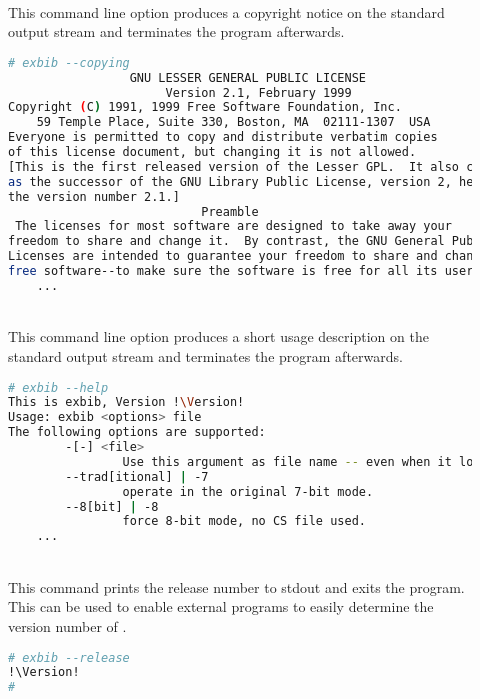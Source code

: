 \begin{description}
\item[]\ \\
  This command line option produces a copyright notice on the standard
  output stream and terminates the program afterwards.
  \begin{lstlisting}[language=sh]
# exbib --copying
                 GNU LESSER GENERAL PUBLIC LICENSE
                      Version 2.1, February 1999
Copyright (C) 1991, 1999 Free Software Foundation, Inc.
    59 Temple Place, Suite 330, Boston, MA  02111-1307  USA
Everyone is permitted to copy and distribute verbatim copies
of this license document, but changing it is not allowed.
[This is the first released version of the Lesser GPL.  It also counts
as the successor of the GNU Library Public License, version 2, hence
the version number 2.1.]
                           Preamble
 The licenses for most software are designed to take away your
freedom to share and change it.  By contrast, the GNU General Public
Licenses are intended to guarantee your freedom to share and change
free software--to make sure the software is free for all its users.
    ...
  \end{lstlisting}

\item[]
\item[]
\item[]\ \\
  This command line option produces a short usage description on the
  standard output stream and terminates the program afterwards.
  \begin{lstlisting}[language=sh,escapechar=!]
# exbib --help
This is exbib, Version !\Version!
Usage: exbib <options> file
The following options are supported:
        -[-] <file>
                Use this argument as file name -- even when it looks like an option.
        --trad[itional] | -7
                operate in the original 7-bit mode.
        --8[bit] | -8
                force 8-bit mode, no CS file used.
    ...
\end{lstlisting}
  
\item[]\ \\
  This command prints the release number to stdout and exits the
  program. This can be used to enable external programs to easily
  determine the version number of \ExBib.
\begin{lstlisting}[language=sh,escapechar=!]
# exbib --release
!\Version!
#
\end{lstlisting}


\end{description}
